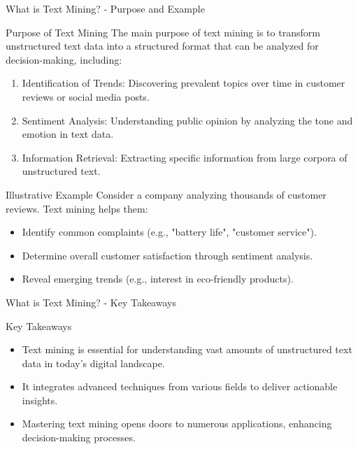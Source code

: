 \documentclass[aspectratio=169]{beamer}
\begin{document}
\begin{frame}[fragile]{What is Text Mining? - Purpose and Example}
    \begin{block}{Purpose of Text Mining}
        The main purpose of text mining is to transform unstructured text data into a structured format that can be analyzed for decision-making, including:
        \begin{enumerate}
            \item Identification of Trends: Discovering prevalent topics over time in customer reviews or social media posts.
            \item Sentiment Analysis: Understanding public opinion by analyzing the tone and emotion in text data.
            \item Information Retrieval: Extracting specific information from large corpora of unstructured text.
        \end{enumerate}
    \end{block}
    
    \begin{block}{Illustrative Example}
        Consider a company analyzing thousands of customer reviews. Text mining helps them:
        \begin{itemize}
            \item Identify common complaints (e.g., "battery life", "customer service").
            \item Determine overall customer satisfaction through sentiment analysis.
            \item Reveal emerging trends (e.g., interest in eco-friendly products).
        \end{itemize}
    \end{block}  
\end{frame}

\begin{frame}[fragile]{What is Text Mining? - Key Takeaways}
    \begin{block}{Key Takeaways}
        \begin{itemize}
            \item Text mining is essential for understanding vast amounts of unstructured text data in today’s digital landscape.
            \item It integrates advanced techniques from various fields to deliver actionable insights.
            \item Mastering text mining opens doors to numerous applications, enhancing decision-making processes.
        \end{itemize}
    \end{block}
\end{frame}
\end{document}
